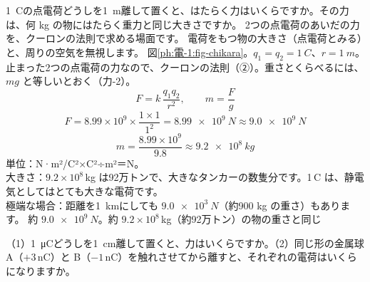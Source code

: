 {}
{}
{}

\label{ph:電-1:ex1}
\begin{phreidai}[1\,C どうしの力]
\qty{1}{C}の点電荷どうしを\qty{1}{m}離して置くと、はたらく力はいくらですか。その力は、何 kg の物にはたらく重力と同じ大きさですか。
\phbamen
2つの点電荷のあいだの力を、クーロンの法則で求める場面です。
\phmushi
電荷をもつ物の大きさ（点電荷とみる）と、周りの空気を無視します。
\phzu
図\ref{ph:電-1:fig-chikara}。$q_1=q_2=\qty{1}{C}$、$r=\qty{1}{m}$。
\phriyu
止まった2つの点電荷の力なので、クーロンの法則（②）。重さとくらべるには、$mg$ と等しいとおく（力-2）。
\phtateru
\[F=k\,\frac{q_1q_2}{r^2},\qquad m=\frac{F}{g}\]
\phtoku
\[F=8.99\times10^9\times\frac{1\times1}{1^2}=\qty{8.99e9}{N}\approx\qty{9.0e9}{N}\]
\[m=\frac{8.99\times10^9}{9.8}\approx\qty{9.2e8}{kg}\]
\phtashikame
単位：N·m²/C²×C²÷m²＝N。\\
大きさ：$9.2\times10^8$\,kg は92万トンで、大きなタンカーの数隻分です。1\,C は、静電気としてはとても大きな電荷です。\\
極端な場合：距離を\qty{1}{km}にしても $\qty{9.0e3}{N}$（約900 kg の重さ）もあります。
\kotae 約 $\qty{9.0e9}{N}$。約 $9.2\times10^8$\,kg（約92万トン）の物の重さと同じ
\end{phreidai}
\begin{jibun}
（1）\qty{1}{\micro C}どうしを\qty{1}{cm}離して置くと、力はいくらですか。（2）同じ形の金属球 A（$+3$\,nC）と B（$-1$\,nC）を触れさせてから離すと、それぞれの電荷はいくらになりますか。
\end{jibun}

